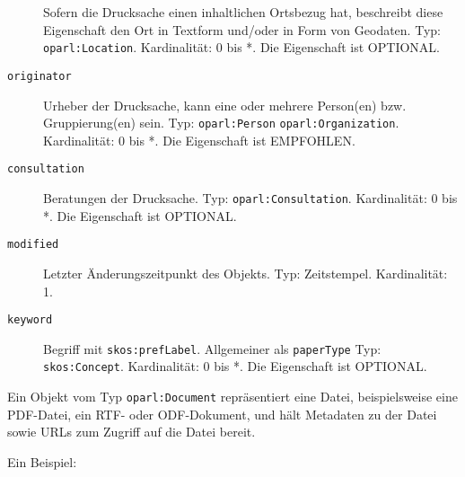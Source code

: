 \documentclass[,a4paper]{article}
\begin{document}
\begin{description}
Sofern die Drucksache einen inhaltlichen Ortsbezug hat, beschreibt diese
Eigenschaft den Ort in Textform und/oder in Form von Geodaten. Typ:
\texttt{oparl:Location}. Kardinalität: 0 bis *. Die Eigenschaft ist
OPTIONAL.
\item[\texttt{originator}]
Urheber der Drucksache, kann eine oder mehrere Person(en) bzw.
Gruppierung(en) sein. Typ: \texttt{oparl:Person} \textbar{}
\texttt{oparl:Organization}. Kardinalität: 0 bis *. Die Eigenschaft ist
EMPFOHLEN.
\item[\texttt{consultation}]
Beratungen der Drucksache. Typ: \texttt{oparl:Consultation}.
Kardinalität: 0 bis *. Die Eigenschaft ist OPTIONAL.
\item[\texttt{modified}]
Letzter Änderungszeitpunkt des Objekts. Typ: Zeitstempel. Kardinalität:
1.
\item[\texttt{keyword}]
Begriff mit \texttt{skos:prefLabel}. Allgemeiner als \texttt{paperType}
Typ: \texttt{skos:Concept}. Kardinalität: 0 bis *. Die Eigenschaft ist
OPTIONAL.
\end{description}


Ein Objekt vom Typ \texttt{oparl:Document} repräsentiert eine Datei,
beispielsweise eine PDF-Datei, ein RTF- oder ODF-Dokument, und hält
Metadaten zu der Datei sowie URLs zum Zugriff auf die Datei bereit.

Ein Beispiel:
\end{document}
